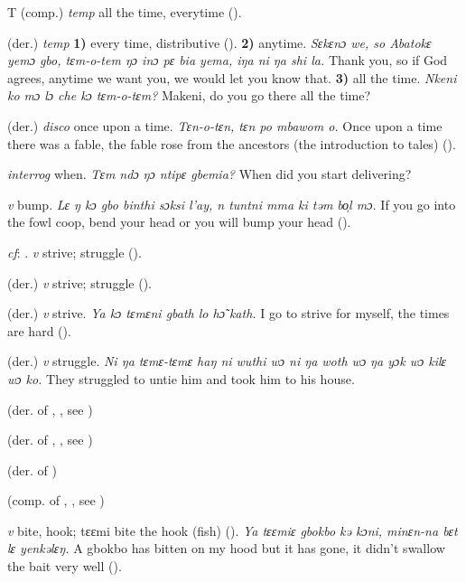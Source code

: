\begin{letter}{T}
 (comp.) \textit{temp} all the time, everytime (\citealt{Pichl1967}). 

 (der.) \textit{temp} \textbf{1)} every time, distributive (\citealt{Pichl1967}). \textbf{2)} anytime. \textit{Sɛkɛnɔ we, so Abatokɛ yemɔ gbo, tɛm-o-tem ŋɔ inɔ pɛ bia yema, iŋa ni ŋa shi la.} Thank you, so if God agrees, anytime we want you, we would let you know that. \textbf{3)} all the time. \textit{Nkeni ko mɔ lɔ che kɔ tɛm-o-tɛm?} Makeni, do you go there all the time?

 (der.) \textit{disco} once upon a time. \textit{Tɛn-o-tɛn, tɛn po mbawom o.} Once upon a time there was a fable, the fable rose from the ancestors (the introduction to tales) (\citealt{Pichl1967}). 

 \textit{interrog} when. \textit{Tɛm ndɔ ŋɔ ntipɛ gbemia?} When did you start delivering?

 \textit{v} bump. \textit{Lɛ ŋ kɔ gbo binthi sɔksi l'ay, n tuntni mma ki təm bo̹l mɔ.} If you go into the fowl coop, bend your head or you will bump your head (\citealt{Pichl1967}). 

 \textit{cf}: . \textit{v} strive; struggle (\citealt{Sumner1921}). 

 (der.) \textit{v} strive; struggle (\citealt{Sumner1921}).

 (der.) \textit{v} strive. \textit{Ya kɔ tɛmɛni gbath lo hɔ̃ kath.} I go to strive for myself, the times are hard (\citealt{Pichl1967}). 

 (der.) \textit{v} struggle. \textit{Ni ŋa tɛmɛ-tɛmɛ haŋ ni wuthi wɔ ni ŋa woth wɔ ŋa yɔk wɔ kilɛ wɔ ko.} They struggled to untie him and took him to his house. 

 (der. of , , see ) 

 (der. of , , see ) 

 (der. of ) 

 (comp. of , , see ) 

 \textit{v} bite, hook; tɛɛmi bite the hook (fish) (\citealt{Pichl1967}). \textit{Ya tɛɛmiɛ gbokbo kə kɔni, minɛn-na bɛt lɛ yenkəlɛŋ.} A gbokbo has bitten on my hood but it has gone, it didn't swallow the bait very well (\citealt{Pichl1967}). 


\end{letter}
